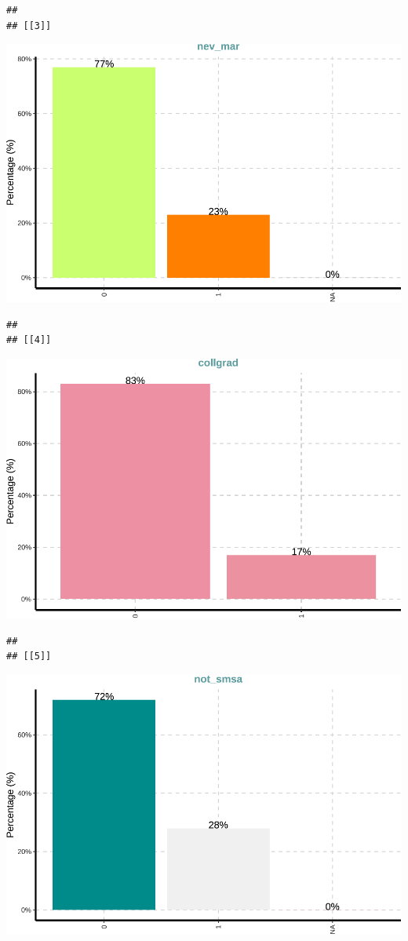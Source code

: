 \documentclass[
]{article}
\begin{document}
\begin{verbatim}
## 
## [[3]]
\end{verbatim}

\includegraphics{notebook_panel_data_files/figure-latex/Exploratory data analysis-3.pdf}

\begin{verbatim}
## 
## [[4]]
\end{verbatim}

\includegraphics{notebook_panel_data_files/figure-latex/Exploratory data analysis-4.pdf}

\begin{verbatim}
## 
## [[5]]
\end{verbatim}

\includegraphics{notebook_panel_data_files/figure-latex/Exploratory data analysis-5.pdf}
\end{document}

